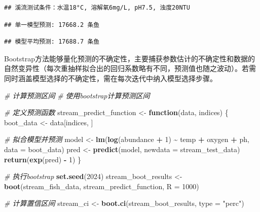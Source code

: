 \documentclass[
  twoside,12pt,fontset=none]{ctexbook}
\newenvironment{Shaded}{\begin{snugshade}}{\end{snugshade}}
\newcommand{\AttributeTok}[1]{\textcolor[rgb]{0.13,0.29,0.53}{#1}}
\newcommand{\CommentTok}[1]{\textcolor[rgb]{0.56,0.35,0.01}{\textit{#1}}}
\newcommand{\ControlFlowTok}[1]{\textcolor[rgb]{0.13,0.29,0.53}{\textbf{#1}}}
\newcommand{\DecValTok}[1]{\textcolor[rgb]{0.00,0.00,0.81}{#1}}
\newcommand{\FunctionTok}[1]{\textcolor[rgb]{0.13,0.29,0.53}{\textbf{#1}}}
\newcommand{\NormalTok}[1]{#1}
\newcommand{\OtherTok}[1]{\textcolor[rgb]{0.56,0.35,0.01}{#1}}
\newcommand{\SpecialCharTok}[1]{\textcolor[rgb]{0.81,0.36,0.00}{\textbf{#1}}}
\newcommand{\StringTok}[1]{\textcolor[rgb]{0.31,0.60,0.02}{#1}}
\begin{document}
\begin{verbatim}
## 溪流测试条件：水温18°C, 溶解氧6mg/L, pH7.5, 浊度20NTU
\end{verbatim}

\begin{verbatim}
## 单一模型预测: 17668.2 条鱼
\end{verbatim}

\begin{verbatim}
## 模型平均预测: 17688.7 条鱼
\end{verbatim}

Bootstrap方法能够量化预测的不确定性，主要捕获参数估计的不确定性和数据的自然变异性（每次重抽样拟合出的回归系数略有不同，预测值也随之波动）。若需同时涵盖模型选择的不确定性，需在每次迭代中纳入模型选择步骤。

\begin{Shaded}
\begin{Highlighting}[]
\CommentTok{\# 计算预测区间}
\CommentTok{\# 使用bootstrap计算预测区间}

\CommentTok{\# 定义预测函数}
\NormalTok{stream\_predict\_function }\OtherTok{\textless{}{-}} \ControlFlowTok{function}\NormalTok{(data, indices) \{}
\NormalTok{  boot\_data }\OtherTok{\textless{}{-}}\NormalTok{ data[indices, ]}

  \CommentTok{\# 拟合模型并预测}
\NormalTok{  model }\OtherTok{\textless{}{-}} \FunctionTok{lm}\NormalTok{(}\FunctionTok{log}\NormalTok{(abundance }\SpecialCharTok{+} \DecValTok{1}\NormalTok{) }\SpecialCharTok{\textasciitilde{}}\NormalTok{ temp }\SpecialCharTok{+}\NormalTok{ oxygen }\SpecialCharTok{+}\NormalTok{ ph, }\AttributeTok{data =}\NormalTok{ boot\_data)}
\NormalTok{  pred }\OtherTok{\textless{}{-}} \FunctionTok{predict}\NormalTok{(model, }\AttributeTok{newdata =}\NormalTok{ stream\_test\_data)}
  \FunctionTok{return}\NormalTok{(}\FunctionTok{exp}\NormalTok{(pred) }\SpecialCharTok{{-}} \DecValTok{1}\NormalTok{)}
\NormalTok{\}}

\CommentTok{\# 执行bootstrap}
\FunctionTok{set.seed}\NormalTok{(}\DecValTok{2024}\NormalTok{)}
\NormalTok{stream\_boot\_results }\OtherTok{\textless{}{-}} \FunctionTok{boot}\NormalTok{(stream\_fish\_data, stream\_predict\_function, }\AttributeTok{R =} \DecValTok{1000}\NormalTok{)}

\CommentTok{\# 计算置信区间}
\NormalTok{stream\_ci }\OtherTok{\textless{}{-}} \FunctionTok{boot.ci}\NormalTok{(stream\_boot\_results, }\AttributeTok{type =} \StringTok{"perc"}\NormalTok{)}
\end{Highlighting}
\end{Shaded}
\end{document}
